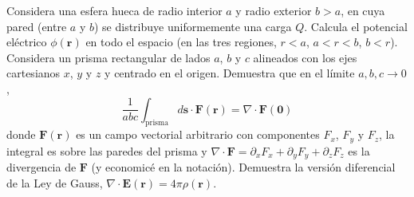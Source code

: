 \documentclass{exam}
\begin{document}
\begin{questions}
  \question Considera una esfera hueca de radio interior $a$ y radio
  exterior $b>a$, en cuya pared (entre $a$ y $b$) se distribuye
  uniformemente una carga $Q$. Calcula el potencial eléctrico
  $\phi(\bm r)$ en todo el espacio (en las tres regiones, $r<a$,
  $a<r<b$, $b<r$).
  \question Considera un prisma rectangular de lados $a$, $b$ y $c$
  alineados con los ejes cartesianos $x$, $y$ y $z$ y centrado en el
  origen. Demuestra que en el límite $a,b,c\to 0$,
  $$
  \frac{1}{abc}\int_{\mathrm{prisma}} d\bm s\cdot \bm F(\bm
  r)=\nabla\cdot \bm F(\bm 0)
  $$
  donde $\bm F(\bm r)$ es un campo vectorial arbitrario con
  componentes $F_x$, $F_y$ y $F_z$, la integral
  es sobre las paredes del prisma y $\nabla\cdot\bm F=\partial_x
  F_x+\partial_y F_y+\partial_z F_z$ es la divergencia de $\bm F$ (y
  economicé en la notación).
  \question Demuestra la versión diferencial de la Ley de Gauss,
  $\nabla\cdot \bm E(\bm r)=4\pi\rho(\bm r)$.
\end{questions}
\end{document}
